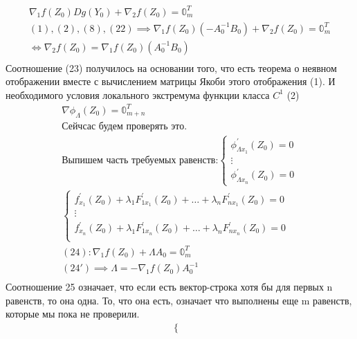 \documentclass[main]{subfiles}
\begin{document}
\begin{longProof}
\begin{gather*}
             \nabla_1 f(Z_0) Dg(Y_0) + \nabla_2 f(Z_0) = \mathbb{0}^T_m \tag{22} \\
             (1), (2), (8), (22) \implies \nabla_1 f(Z_0)(-A_0^{-1}B_0) + \nabla_2 f(Z_0) = \mathbb{0}^T_m \\
             \Leftrightarrow \nabla_2 f(Z_0) = \nabla_1 f(Z_0)(A_0^{-1}B_0) \tag{23} \\
            \end{gather*}
             Соотношение (23) получилось на основании того, что есть теорема о неявном отображении вместе с вычислением матрицы Якоби этого отображения (1).
             И  необходимого условия локального экстремума функции класса $C^1$ (2) 
             \begin{gather*}
             \nabla \phi_\Lambda(Z_0) = \mathbb{0}^T_{m+n} \tag{?} \\
             \text{Сейчсас будем проверять это.} \\
             \text{Выпишем часть требуемых равенств:} 
             \begin{cases}
                \phi^\prime_{\Lambda x_1} (Z_0) = 0 \\
                \vdots \\
                \phi^\prime_{\Lambda x_n} (Z_0) = 0
              \end{cases} \tag{24} \\
              \begin{cases}
                f^\prime_{x_1}(Z_0) + \lambda_1 F^\prime_{1x_1}(Z_0) + \ldots + \lambda_n F^\prime_{nx_1}(Z_0) = 0 \\
                \vdots \\
                f^\prime_{x_n}(Z_0) + \lambda_1 F^\prime_{1x_n}(Z_0) + \ldots + \lambda_n F^\prime_{nx_n}(Z_0) = 0 \\
              \end{cases} \\
              (24): \nabla_1 f(Z_0) + \Lambda A_0 = \mathbb{0}^T_m \tag{24\prime} \\
              (24\prime) \implies \Lambda = -\nabla_1 f(Z_0) A_0^{-1} \tag{25} \\
            \end{gather*}
              Соотношение 25 означает, что если есть вектор-строка хотя бы для первых n равенств, то она одна. То, что она есть, означает
              что выполнены еще m равенств, которые мы пока не проверили.
              \begin{gather*}
              \begin{cases}

\end{cases}
\end{gather*}
\end{longProof}
\end{document}
